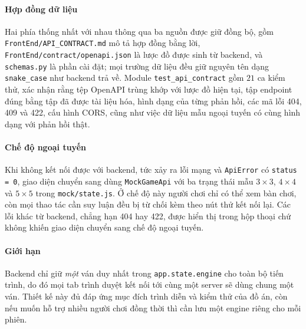 \begin{sloppypar}
\paragraph{Hợp đồng dữ liệu}
Hai phía thống nhất với nhau thông qua ba nguồn được giữ đồng bộ, gồm
\texttt{FrontEnd/API\_CONTRACT.md} mô tả hợp đồng bằng lời,
\texttt{FrontEnd/contract/openapi.json} là lược đồ được sinh từ backend, và
\texttt{schemas.py} là phần cài đặt; mọi trường dữ liệu đều giữ nguyên tên dạng
\texttt{snake\_case} như backend trả về. Module \texttt{test\_api\_contract} gồm
$21$ ca kiểm thử, xác nhận rằng tệp OpenAPI trùng khớp với lược đồ hiện tại, tập
endpoint đúng bằng tập đã được tài liệu hóa, hình dạng của từng phản hồi, các mã
lỗi 404, 409 và 422, cấu hình CORS, cũng như việc dữ liệu mẫu ngoại tuyến có cùng
hình dạng với phản hồi thật.

\paragraph{Chế độ ngoại tuyến}
Khi không kết nối được với backend, tức xảy ra lỗi mạng và \texttt{ApiError} có
\texttt{status = 0}, giao diện chuyển sang dùng \texttt{MockGameApi} với ba trạng
thái mẫu $3\times3$, $4\times4$ và $5\times5$ trong \nolinkurl{mock/state.js}.
Ở chế độ này người chơi chỉ có thể xem bàn chơi, còn mọi thao tác cần suy luận
đều bị từ chối kèm theo nút thử kết nối lại. Các lỗi khác từ backend, chẳng hạn
404 hay 422, được hiển thị trong hộp thoại chứ không khiến giao diện chuyển sang
chế độ ngoại tuyến.

\paragraph{Giới hạn}
Backend chỉ giữ \emph{một} ván duy nhất trong \texttt{app.state.engine} cho toàn
bộ tiến trình, do đó mọi tab trình duyệt kết nối tới cùng một server sẽ dùng
chung một ván. Thiết kế này đủ đáp ứng mục đích trình diễn và kiểm thử của đồ
án, còn nếu muốn hỗ trợ nhiều người chơi đồng thời thì cần lưu một engine riêng
cho mỗi phiên.
\end{sloppypar}
